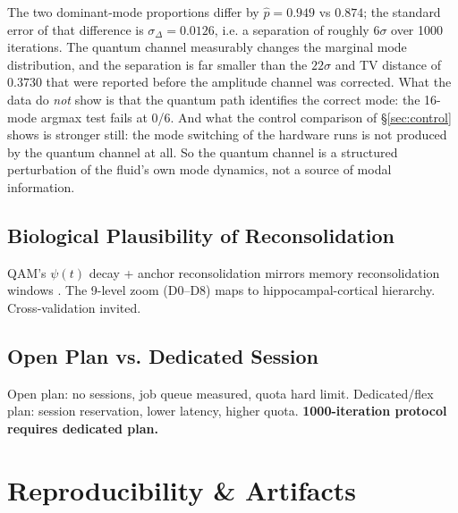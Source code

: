 \documentclass[sigconf,anonymous=false]{acmart}
\begin{document}
The two dominant-mode proportions differ by $\hat p = 0.949$ vs $0.874$; the standard error of
that difference is $\sigma_{\Delta} = 0.0126$, i.e. a separation of roughly $6\sigma$ over
1000 iterations. The quantum channel measurably changes the marginal mode distribution, and the
separation is far smaller than the $22\sigma$ and TV distance of $0.3730$ that were reported
before the amplitude channel was corrected. What the data do \emph{not} show is
that the quantum path identifies the correct mode: the 16-mode argmax test fails at 0/6.
And what the control comparison of \S\ref{sec:control} shows is stronger still: the mode
switching of the hardware runs is not produced by the quantum channel at all.
So the quantum channel is a structured perturbation of the fluid's own mode dynamics, not a source
of modal information.

\subsection{Biological Plausibility of Reconsolidation}
QAM's $\psi(t)$ decay + anchor reconsolidation mirrors memory reconsolidation windows \cite{Nader2000}. The 9-level zoom (D0--D8) maps to hippocampal-cortical hierarchy. Cross-validation invited.

\subsection{Open Plan vs. Dedicated Session}
Open plan: no sessions, job queue measured, quota hard limit. Dedicated/flex plan: session reservation, lower latency, higher quota. \textbf{1000-iteration protocol requires dedicated plan.}

\section{Reproducibility \& Artifacts}
\end{document}
